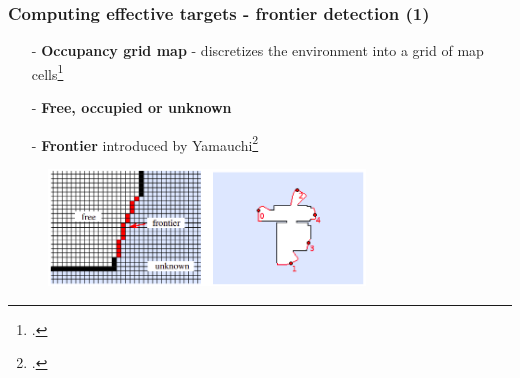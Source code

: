 
\begin{frame}
	\frametitle{Computing effective targets - frontier detection (1)}
	\begin{itemize}
		\item[-] \textbf{Occupancy grid map} - discretizes the environment into a grid of map cells\footcite{Moravec}
		\item[-] \textbf{Free, occupied or unknown}
		\item[-] \textbf{Frontier} introduced by Yamauchi\footcite{Yamauchi1997} 				
	\end{itemize}
	\begin{figure}
		\centering
		\includegraphics[width=0.75\textwidth]{figures/environment1}
	\end{figure}
\end{frame}

